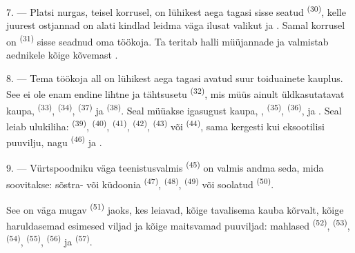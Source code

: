 7. --- Platsi nurgas, teisel korrusel, on lühikest aega tagasi sisse seatud
 \textsuperscript{(30)}, kelle juurest ostjannad on alati kindlad
leidma väga ilusat valikut  ja
. Samal korrusel on  \textsuperscript{(31)} sisse
seadnud oma töökoja. Ta teritab halli müüjannade  ja valmistab aednikele
 kõige kõvemast .

\VUsaut{4.0mm}
\VUsaut{3.0mm}

8. --- Tema töökoja all on lühikest aega tagasi avatud suur toiduainete kauplus. See ei
ole enam endine lihtne ja tähtsusetu  \textsuperscript{(32)}, mis müüs
ainult üldkasutatavat kaupa,  \textsuperscript{(33)}, 
\textsuperscript{(34)},  \textsuperscript{(37)} ja 
\textsuperscript{(38)}. Seal müüakse igasugust kaupa, ,
 \textsuperscript{(35)},  \textsuperscript{(36)},
 ja . Seal leiab
ulukiliha:  \textsuperscript{(39)}, 
\textsuperscript{(40)},  \textsuperscript{(41)}, 
\textsuperscript{(42)},  \textsuperscript{(43)} või 
\textsuperscript{(44)}, sama kergesti kui eksootilisi puuvilju, nagu 
\textsuperscript{(46)} ja .

9. --- Vürtspoodniku väga teenistusvalmis  \textsuperscript{(45)} on valmis
andma seda, mida soovitakse: sõstra- või küdoonia \textsuperscript{(47)},
 \textsuperscript{(48)},  \textsuperscript{(49)} või
soolatud  \textsuperscript{(50)}.

See on väga mugav  \textsuperscript{(51)} jaoks, kes leiavad, kõige
tavalisema kauba kõrvalt, kõige haruldasemad esimesed viljad ja kõige maitsvamad
puuviljad: mahlased  \textsuperscript{(52)}, 
\textsuperscript{(53)},  \textsuperscript{(54)}, 
\textsuperscript{(55)},  \textsuperscript{(56)} ja 
\textsuperscript{(57)}.

\VUsaut{4.0mm}
\VUsaut{3.0mm}

